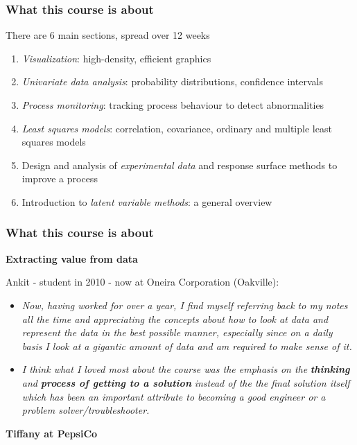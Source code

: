 \begin{frame}\frametitle{What this course is about}
	
	There are 6 main sections, spread over 12 weeks
	\begin{enumerate}
		\item	\emph{Visualization}: high-density, efficient graphics 
		\item	\emph{Univariate data analysis}: probability distributions, confidence intervals 
		\item	\emph{Process monitoring}: tracking process behaviour to detect abnormalities 
		\item	\emph{Least squares models}: correlation, covariance, ordinary and multiple least squares models 
		\item	Design and analysis of \emph{experimental data} and response surface methods to improve a process 
		\item	Introduction to \emph{latent variable methods}: a general overview 
	\end{enumerate}
\end{frame}

\begin{frame}\frametitle{What this course is about}
	
	\textbf{Extracting value from data}
	
	Ankit - student in 2010 - now at Oneira Corporation (Oakville):
	\begin{itemize}
		\item	\emph{Now, having worked for over a year, I find myself referring back to my notes all the time and appreciating the concepts about how to look at data and represent the data in the best possible manner, especially since on a daily basis I look at a gigantic amount of data and am required to make sense of it.} 
	\end{itemize}
	\begin{itemize}
		\item	\emph{I think what I loved most about the course was the emphasis on the} \textbf{\emph{thinking}} \emph{and} \textbf{\emph{process of getting to a solution}} \emph{instead of the the final solution itself which has been an important attribute to becoming a good engineer or a problem solver/troubleshooter.} 
	\end{itemize}
	
	\vspace{12pt}
	\textbf{Tiffany at PepsiCo}
\end{frame}

